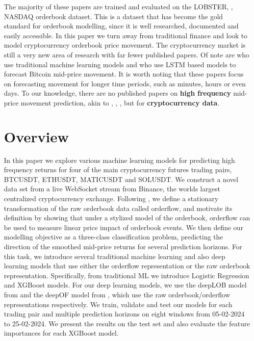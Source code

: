 The majority of these papers are trained and evaluated on the LOBSTER, \cite{LOBSTER2011}, NASDAQ orderbook dataset. This is a dataset
that has become the gold standard for orderbook modelling, since it is well researched, documented and easily accessible. 
In this paper we turn away from traditional finance and look to model cryptocurrency orderbook price movement.
The cryptocurrency market is still a very new area of research with far fewer published papers.
Of note are \cite{AKYILDIRIM2023} who use traditional machine learning models and \cite{SHIN2021} who use LSTM based models
to forecast Bitcoin mid-price movement. It is worth noting that these papers focus on forecasting movement for longer time periods,
such as minutes, hours or even days. To our knowledge, there are no published papers on \textbf{high frequency} mid-price movement prediction, akin to
\cite{ZHANG2019}, \cite{KOLM2023}, \cite{LUCCHESE2024}, but for \textbf{cryptocurrency data}. 

\section{Overview}
In this paper we explore various machine learning models for predicting high frequency returns
for four of the main cryptocurrency futures trading pairs, BTCUSDT, ETHUSDT, MATICUSDT and SOLUSDT. 
We construct a novel data set from a live WebSocket stream from Binance, the worlds largest centralized cryptocurrency exchange.
Following \cite{CONT2013}, we define a stationary transformation of the raw orderbook data called orderflow, 
and motivate its definition by showing that under a stylized model of the orderbook, orderflow can be used to measure linear price impact
of orderbook events. We then define our modelling objective as a three-class classification problem, predicting the direction of the smoothed
mid-price returns for several prediction horizons. For this task, we introduce several traditional machine learning and also deep learning
models that use either the orderflow representation or the raw orderbook representation. Specifically, from traditional ML we introduce
Logistic Regression and XGBoost models. For our deep learning models, we use the deepLOB model from \cite{ZHANG2019} and the deepOF model
from \cite{KOLM2023}, which use the raw orderbook/orderflow representations respectively.
We train, validate and test our models for each trading pair and multiple prediction horizons on eight windows from 05-02-2024 to 25-02-2024.
We present the results on the test set and also evaluate the feature importances for each XGBoost model.

